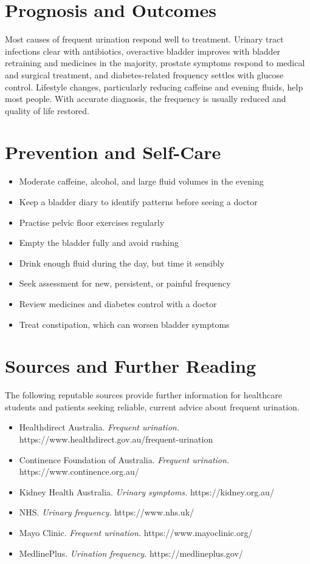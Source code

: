 \section*{Prognosis and Outcomes}
Most causes of frequent urination respond well to treatment. Urinary tract infections clear with antibiotics, overactive bladder improves with bladder retraining and medicines in the majority, prostate symptoms respond to medical and surgical treatment, and diabetes-related frequency settles with glucose control. Lifestyle changes, particularly reducing caffeine and evening fluids, help most people. With accurate diagnosis, the frequency is usually reduced and quality of life restored.

\section*{Prevention and Self-Care}
\begin{itemize}
    \item Moderate caffeine, alcohol, and large fluid volumes in the evening
    \item Keep a bladder diary to identify patterns before seeing a doctor
    \item Practise pelvic floor exercises regularly
    \item Empty the bladder fully and avoid rushing
    \item Drink enough fluid during the day, but time it sensibly
    \item Seek assessment for new, persistent, or painful frequency
    \item Review medicines and diabetes control with a doctor
    \item Treat constipation, which can worsen bladder symptoms
\end{itemize}

\section*{Sources and Further Reading}
The following reputable sources provide further information for healthcare students and patients seeking reliable, current advice about frequent urination.
\begin{itemize}
    \item Healthdirect Australia. \textit{Frequent urination.} https://www.healthdirect.gov.au/frequent-urination
    \item Continence Foundation of Australia. \textit{Frequent urination.} https://www.continence.org.au/
    \item Kidney Health Australia. \textit{Urinary symptoms.} https://kidney.org.au/
    \item NHS. \textit{Urinary frequency.} https://www.nhs.uk/
    \item Mayo Clinic. \textit{Frequent urination.} https://www.mayoclinic.org/
    \item MedlinePlus. \textit{Urination frequency.} https://medlineplus.gov/
\end{itemize}
